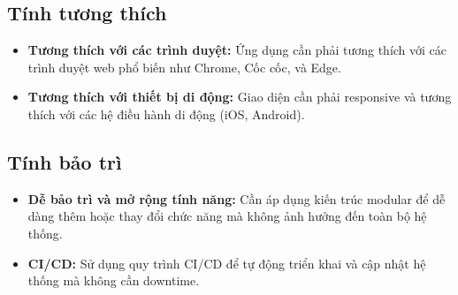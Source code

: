 \subsection{Tính tương thích}
\begin{itemize}
    \item \textbf{Tương thích với các trình duyệt:} Ứng dụng cần phải tương thích với các trình duyệt web phổ biến như Chrome, Cốc cốc, và Edge.
    \item \textbf{Tương thích với thiết bị di động:} Giao diện cần phải responsive và tương thích với các hệ điều hành di động (iOS, Android).
\end{itemize}

\subsection{Tính bảo trì}
\begin{itemize}
    \item \textbf{Dễ bảo trì và mở rộng tính năng:} Cần áp dụng kiến trúc modular để dễ dàng thêm hoặc thay đổi chức năng mà không ảnh hưởng đến toàn bộ hệ thống.
    \item \textbf{CI/CD:} Sử dụng quy trình CI/CD để tự động triển khai và cập nhật hệ thống mà không cần downtime.
\end{itemize}
